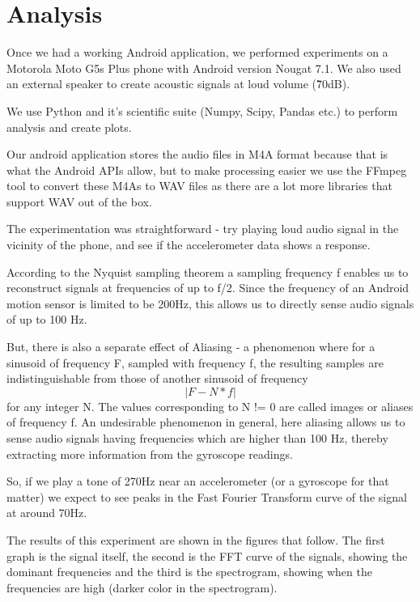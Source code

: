 \chapter{Analysis}

Once we had a working Android application, we performed experiments on a Motorola Moto G5s Plus phone with Android version Nougat 7.1. We also used an external speaker to create acoustic signals at loud volume (\~70dB).

We use Python and it's scientific suite (Numpy, Scipy, Pandas etc.) to perform analysis and create plots.

Our android application stores the audio files in M4A format because that is what the Android APIs allow, but to make processing easier we use the FFmpeg tool to convert these M4As to WAV files as there are a lot more libraries that support WAV out of the box.

The experimentation was straightforward - try playing loud audio signal in the vicinity of the phone, and see if the accelerometer data shows a response.

According to the Nyquist sampling theorem a sampling frequency f enables us to reconstruct signals at frequencies of up to f/2. Since the frequency of an Android motion sensor is limited to be 200Hz, this allows us to directly sense audio signals of up to 100 Hz.

But, there is also a separate effect of Aliasing \cite{gyrophone} - a phenomenon where for a sinusoid of frequency F, sampled with frequency f, the resulting samples are indistinguishable from those of another sinusoid of frequency \[|F - N*f|\] for any integer N. The values corresponding to N != 0 are called images or aliases of frequency f. An undesirable phenomenon in general, here aliasing allows us to sense audio signals having frequencies which are higher than 100 Hz, thereby extracting more information from the gyroscope readings.

So, if we play a tone of 270Hz near an accelerometer (or a gyroscope for that matter) we expect to see peaks in the Fast Fourier Transform curve of the signal at around 70Hz.

The results of this experiment are shown in the figures that follow. The first graph is the signal itself, the second is the FFT curve of the signals, showing the dominant frequencies and the third is the spectrogram, showing when the frequencies are high (darker color in the spectrogram).


